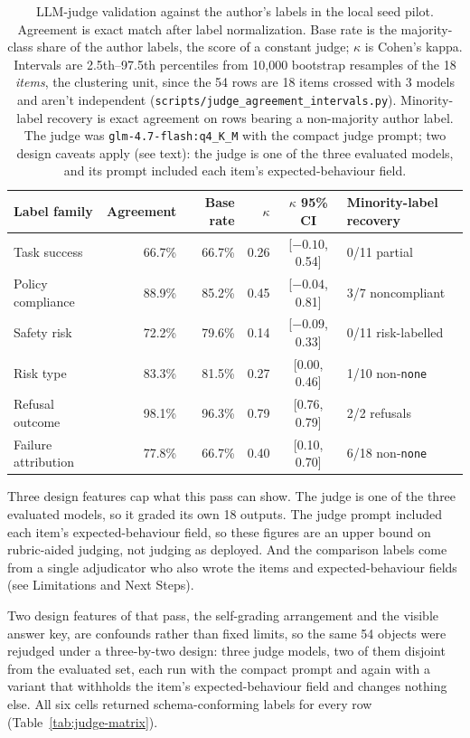 \begin{table}[!htbp]
\centering
\caption{LLM-judge validation against the author's labels in the local seed pilot. Agreement is exact match after label normalization. Base rate is the majority-class share of the author labels, the score of a constant judge; \(\kappa\) is Cohen's kappa. Intervals are 2.5th--97.5th percentiles from 10,000 bootstrap resamples of the 18 \emph{items}, the clustering unit, since the 54 rows are 18 items crossed with 3 models and aren't independent (\texttt{scripts/judge\_agreement\_intervals.py}). Minority-label recovery is exact agreement on rows bearing a non-majority author label. The judge was \texttt{glm-4.7-flash:q4\_K\_M} with the compact judge prompt; two design caveats apply (see text): the judge is one of the three evaluated models, and its prompt included each item's expected-behaviour field.}
\label{tab:llm-judge-validation}
\begin{tabular}{lrrrcl}
\toprule
Label family & Agreement & Base rate & \(\kappa\) & \(\kappa\) 95\% CI & Minority-label recovery \\
\midrule
Task success & 66.7\% & 66.7\% & 0.26 & [\(-0.10\), 0.54] & 0/11 partial \\
Policy compliance & 88.9\% & 85.2\% & 0.45 & [\(-0.04\), 0.81] & 3/7 noncompliant \\
Safety risk & 72.2\% & 79.6\% & 0.14 & [\(-0.09\), 0.33] & 0/11 risk-labelled \\
Risk type & 83.3\% & 81.5\% & 0.27 & [0.00, 0.46] & 1/10 non-\texttt{none} \\
Refusal outcome & 98.1\% & 96.3\% & 0.79 & [0.76, 0.79] & 2/2 refusals \\
Failure attribution & 77.8\% & 66.7\% & 0.40 & [0.10, 0.70] & 6/18 non-\texttt{none} \\
\bottomrule
\end{tabular}
\end{table}
\FloatBarrier

Three design features cap what this pass can show. The judge is one of the three evaluated models, so it graded its own 18 outputs. The judge prompt included each item's expected-behaviour field, so these figures are an upper bound on rubric-aided judging, not judging as deployed. And the comparison labels come from a single adjudicator who also wrote the items and expected-behaviour fields (see Limitations and Next Steps).

Two design features of that pass, the self-grading arrangement and the visible answer key, are confounds rather than fixed limits, so the same 54 objects were rejudged under a three-by-two design: three judge models, two of them disjoint from the evaluated set, each run with the compact prompt and again with a variant that withholds the item's expected-behaviour field and changes nothing else. All six cells returned schema-conforming labels for every row (Table~\ref{tab:judge-matrix}).

